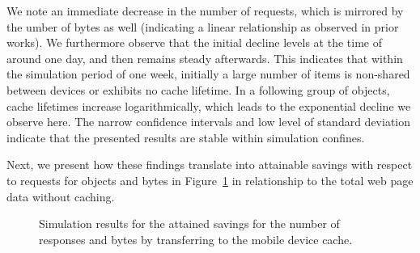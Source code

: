 \documentclass[letterpaper,conference]{IEEEtran}
\begin{document}
We note an immediate decrease in the number of requests, which is mirrored by the umber of bytes as well (indicating a linear relationship as observed in prior works).
We furthermore observe that the initial decline levels at the time of around one day, and then remains steady afterwards.
This indicates that within the simulation period of one week, initially a large number of items is non-shared between devices or exhibits no cache lifetime. 
In a following group of objects, cache lifetimes increase logarithmically, which leads to the exponential decline we observe here.
The narrow confidence intervals and low level of standard deviation indicate that the presented results are stable within simulation confines.
%

Next, we present how these findings translate into attainable savings with respect to requests for objects and bytes in Figure~\ref{fig:sim2} in relationship to the total web page data without caching.
\begin{figure}[]
	\centering
	\hfil
	\caption{Simulation results for the attained savings for the number of responses and bytes by transferring to the mobile device cache.}
	\label{fig:sim2}
\end{figure}
\end{document}
